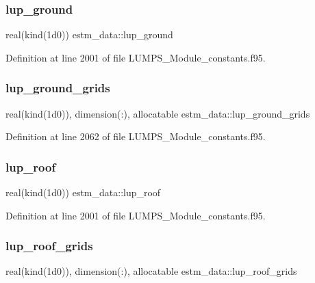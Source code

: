 \subsubsection{\texorpdfstring{lup\+\_\+ground}{lup\_ground}}
{\footnotesize\ttfamily real(kind(1d0)) estm\+\_\+data\+::lup\+\_\+ground}



Definition at line 2001 of file L\+U\+M\+P\+S\+\_\+\+Module\+\_\+constants.\+f95.

\mbox{\label{namespaceestm__data_a977124a50a548296f4426725f2a326e2}} 
\subsubsection{\texorpdfstring{lup\+\_\+ground\+\_\+grids}{lup\_ground\_grids}}
{\footnotesize\ttfamily real(kind(1d0)), dimension(\+:), allocatable estm\+\_\+data\+::lup\+\_\+ground\+\_\+grids}



Definition at line 2062 of file L\+U\+M\+P\+S\+\_\+\+Module\+\_\+constants.\+f95.

\mbox{\label{namespaceestm__data_a5558ed804a2422c76b44ba02ce96305b}} 
\subsubsection{\texorpdfstring{lup\+\_\+roof}{lup\_roof}}
{\footnotesize\ttfamily real(kind(1d0)) estm\+\_\+data\+::lup\+\_\+roof}



Definition at line 2001 of file L\+U\+M\+P\+S\+\_\+\+Module\+\_\+constants.\+f95.

\mbox{\label{namespaceestm__data_a0086dd575cf8c39c41112cd3ce9ac5eb}} 
\subsubsection{\texorpdfstring{lup\+\_\+roof\+\_\+grids}{lup\_roof\_grids}}
{\footnotesize\ttfamily real(kind(1d0)), dimension(\+:), allocatable estm\+\_\+data\+::lup\+\_\+roof\+\_\+grids}



